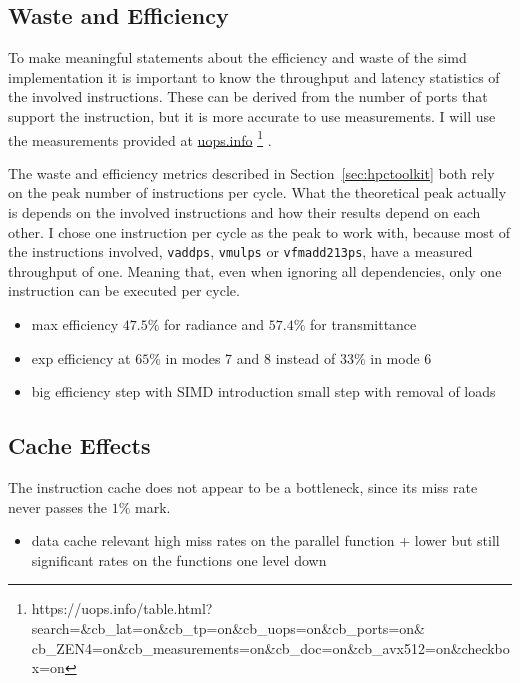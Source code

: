 \documentclass[a4paper, 11pt]{memoir}
\begin{document}
    \subsection{Waste and Efficiency}
    \label{sec:res_waste}
    To make meaningful statements about the efficiency and waste of the \gls{simd} implementation it is important to know
    the \gls{throughput} and \gls{latency} statistics of the involved instructions. These can be derived from the number
    of ports that support the instruction, but it is more accurate to use measurements. I will use the measurements
    provided at \href{https://uops.info/table.html?search=&cb_lat=on&cb_tp=on&cb_uops=on&cb_ports=on&cb_ZEN4=on&cb_measurements=on&cb_doc=on&cb_avx512=on&checkbox=on}{uops.info}
    \footnote{https://uops.info/table.html?search=\&cb\_lat=on\&cb\_tp=on\&cb\_uops=on\&cb\_ports=on\&\\cb\_ZEN4=on\&cb\_measurements=on\&cb\_doc=on\&cb\_avx512=on\&checkbox=on}
    \cite{Abel19a}.

    The waste and efficiency metrics described in Section~\ref{sec:hpctoolkit} both rely on the peak number of instructions
    per cycle. What the theoretical peak actually is depends on the involved instructions and how their results depend
    on each other. I chose one instruction per cycle as the peak to work with, because most of the instructions
    involved, \eg \texttt{vaddps}, \texttt{vmulps} or \texttt{vfmadd213ps}, have a measured
    \gls{throughput} of one. Meaning that, even when ignoring all dependencies, only one instruction can be executed per
    cycle.

    \begin{itemize}
        \item max efficiency $47.5\%$ for radiance and $57.4\%$ for transmittance
        \item exp efficiency at $65\%$ in modes  7 and 8 instead of $33\%$ in mode 6
        \item big efficiency step with SIMD introduction small step with removal of loads
    \end{itemize}

    \subsection{Cache Effects}
    \label{sec:res_cache}
    The instruction cache does not appear to be a bottleneck, since its miss rate never passes the $1\%$ mark.
    \begin{itemize}
        \item data cache relevant high miss rates on the parallel function + lower but still significant rates on the functions one level down
    \end{itemize}
\end{document}
